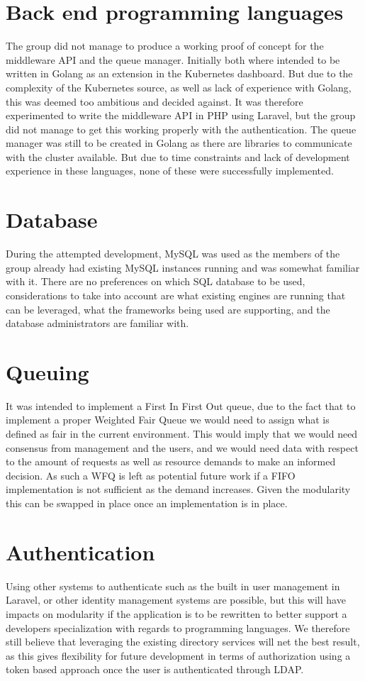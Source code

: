 \documentclass[../main.tex]{subfiles}
\begin{document}
\section*{Back end programming languages}
The group did not manage to produce a working proof of concept for the middleware API and the queue manager. Initially both where intended to be written in Golang as an extension in the Kubernetes dashboard. But due to the complexity of the Kubernetes source, as well as lack of experience with Golang, this was deemed too ambitious and decided against. It was therefore experimented to write the middleware API in PHP using Laravel, but the group did not manage to get this working properly with the authentication. The queue manager was still to be created in Golang as there are libraries to communicate with the cluster available. But due to time constraints and lack of development experience in these languages, none of these were successfully implemented.

\section*{Database}
During the attempted development, MySQL was used as the members of the group already had existing MySQL instances running and was somewhat familiar with it. There are no preferences on which SQL database to be used, considerations to take into account are what existing engines are running that can be leveraged, what the frameworks being used are supporting, and the database administrators are familiar with.

\section*{Queuing}
It was intended to implement a First In First Out queue, due to the fact that to implement a proper Weighted Fair Queue we would need to assign what is defined as fair in the current environment. This would imply that we would need consensus from management and the users, and we would need data with respect to the amount of requests as well as resource demands to make an informed decision. As such a WFQ is left as potential future work if a FIFO implementation is not sufficient as the demand increases. Given the modularity this can be swapped in place once an implementation is in place.

\section*{Authentication}
Using other systems to authenticate such as the built in user management in Laravel, or other identity management systems are possible, but this will have impacts on modularity if the application is to be rewritten to better support a developers specialization with regards to programming languages. We therefore still believe that leveraging the existing directory services will net the best result, as this gives flexibility for future development in terms of authorization using a token based approach once the user is authenticated through LDAP.
\end{document}
